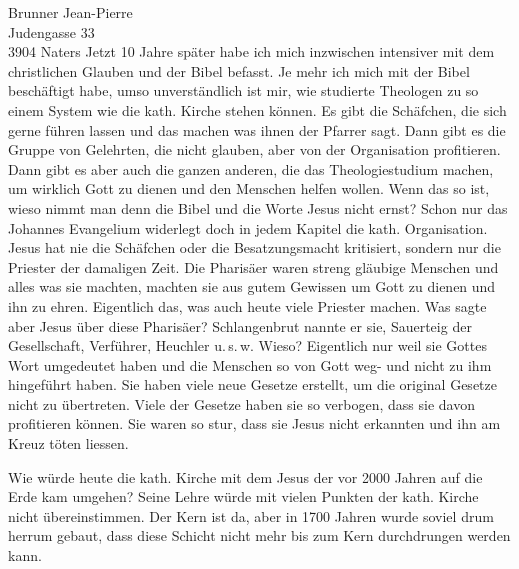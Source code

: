 \documentclass[
    12pt,
    a4paper,
    letter,
    parskip=yes,
    ]{scrlttr2}
\begin{document}
\begin{letter}{
Brunner Jean-Pierre\\
Judengasse 33\\
3904 Naters}
Jetzt 10 Jahre später habe ich mich inzwischen intensiver mit dem christlichen Glauben und der Bibel befasst. Je mehr ich mich mit der Bibel beschäftigt habe, umso unverständlich ist mir, wie studierte Theologen zu so einem System wie die kath. Kirche stehen können. Es gibt die Schäfchen, die sich gerne führen lassen und das machen was ihnen der Pfarrer sagt. Dann gibt es die Gruppe von Gelehrten, die nicht glauben, aber von der Organisation profitieren. Dann gibt es aber auch die ganzen anderen, die das Theologiestudium machen, um wirklich Gott zu dienen und den Menschen helfen wollen. Wenn das so ist, wieso nimmt man denn die Bibel und die Worte Jesus nicht ernst? Schon nur das Johannes Evangelium widerlegt doch in jedem Kapitel die kath. Organisation. Jesus hat nie die Schäfchen oder die Besatzungsmacht kritisiert, sondern nur die Priester der damaligen Zeit. Die Pharisäer waren streng gläubige Menschen und alles was sie machten, machten sie aus gutem Gewissen um Gott zu dienen und ihn zu ehren. Eigentlich das, was auch heute viele Priester machen. Was sagte aber Jesus über diese Pharisäer? Schlangenbrut nannte er sie, Sauerteig der Gesellschaft, Verführer, Heuchler u.\,s.\,w. Wieso? Eigentlich nur weil sie Gottes Wort umgedeutet haben und die Menschen so von Gott weg- und nicht zu ihm hingeführt haben. Sie haben viele neue Gesetze erstellt, um die original Gesetze nicht zu übertreten. Viele der Gesetze haben sie so verbogen, dass sie davon profitieren können. Sie waren so stur, dass sie Jesus nicht erkannten und ihn am Kreuz töten liessen.

Wie würde heute die kath. Kirche mit dem Jesus der vor 2000 Jahren auf die Erde kam umgehen? Seine Lehre würde mit vielen Punkten der kath. Kirche nicht übereinstimmen. Der Kern ist da, aber in 1700 Jahren wurde soviel drum herrum gebaut, dass diese Schicht nicht mehr bis zum Kern durchdrungen werden kann. 


\end{letter}
\end{document}

